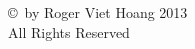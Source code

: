 \newpage

\thispagestyle{empty}
\setcounter{page}{0}

\hspace*{1in}

\vfill
\begin{center}
\copyright \ by Roger Viet Hoang 2013\\
All Rights Reserved
\end{center}

\hspace*{1in}
\vfill
